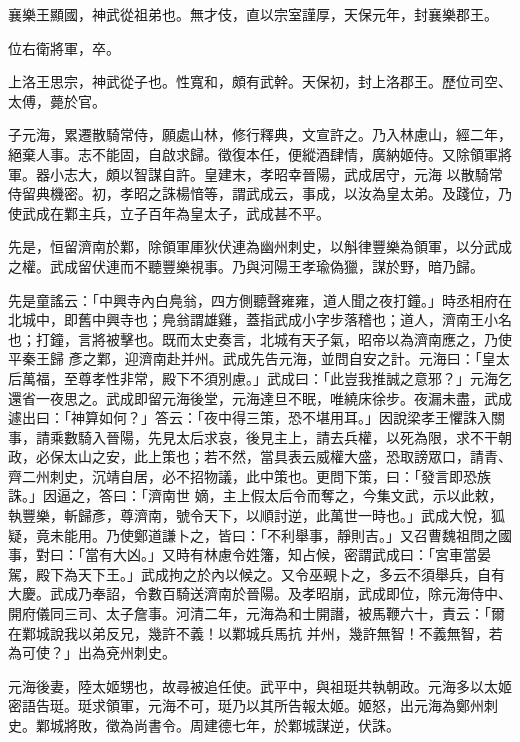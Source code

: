 \begin{pinyinscope}
 襄樂王顯國，神武從祖弟也。無才伎，直以宗室謹厚，天保元年，封襄樂郡王。



 位右衛將軍，卒。



 上洛王思宗，神武從子也。性寬和，頗有武幹。天保初，封上洛郡王。歷位司空、太傅，薨於官。



 子元海，累遷散騎常侍，願處山林，修行釋典，文宣許之。乃入林慮山，經二年，絕棄人事。志不能固，自啟求歸。徵復本任，便縱酒肆情，廣納姬侍。又除領軍將軍。器小志大，頗以智謀自許。皇建末，孝昭幸晉陽，武成居守，元海
 以散騎常侍留典機密。初，孝昭之誅楊愔等，謂武成云，事成，以汝為皇太弟。及踐位，乃使武成在鄴主兵，立子百年為皇太子，武成甚不平。



 先是，恒留濟南於鄴，除領軍厙狄伏連為幽州刺史，以斛律豐樂為領軍，以分武成之權。武成留伏連而不聽豐樂視事。乃與河陽王孝瑜偽獵，謀於野，暗乃歸。



 先是童謠云：「中興寺內白鳧翁，四方側聽聲雍雍，道人聞之夜打鐘。」時丞相府在北城中，即舊中興寺也；鳧翁謂雄雞，蓋指武成小字步落稽也；道人，濟南王小名也；打鐘，言將被擊也。既而太史奏言，北城有天子氣，昭帝以為濟南應之，乃使平秦王歸
 彥之鄴，迎濟南赴并州。武成先告元海，並問自安之計。元海曰：「皇太后萬福，至尊孝性非常，殿下不須別慮。」武成曰：「此豈我推誠之意邪？」元海乞還省一夜思之。武成即留元海後堂，元海達旦不眠，唯繞床徐步。夜漏未盡，武成遽出曰：「神算如何？」答云：「夜中得三策，恐不堪用耳。」因說梁孝王懼誅入關事，請乘數騎入晉陽，先見太后求哀，後見主上，請去兵權，以死為限，求不干朝政，必保太山之安，此上策也；若不然，當具表云威權大盛，恐取謗眾口，請青、齊二州刺史，沉靖自居，必不招物議，此中策也。更問下策，曰：「發言即恐族誅。」因逼之，答曰：「濟南世
 嫡，主上假太后令而奪之，今集文武，示以此敕，執豐樂，斬歸彥，尊濟南，號令天下，以順討逆，此萬世一時也。」武成大悅，狐疑，竟未能用。乃使鄭道謙卜之，皆曰：「不利舉事，靜則吉。」又召曹魏祖問之國事，對曰：「當有大凶。」又時有林慮令姓籓，知占候，密謂武成曰：「宮車當晏駕，殿下為天下王。」武成拘之於內以候之。又令巫覡卜之，多云不須舉兵，自有大慶。武成乃奉詔，令數百騎送濟南於晉陽。及孝昭崩，武成即位，除元海侍中、開府儀同三司、太子詹事。河清二年，元海為和士開譖，被馬鞭六十，責云：「爾在鄴城說我以弟反兄，幾許不義！以鄴城兵馬抗
 并州，幾許無智！不義無智，若為可使？」出為兗州刺史。



 元海後妻，陸太姬甥也，故尋被追任使。武平中，與祖珽共執朝政。元海多以太姬密語告珽。珽求領軍，元海不可，珽乃以其所告報太姬。姬怒，出元海為鄭州刺史。鄴城將敗，徵為尚書令。周建德七年，於鄴城謀逆，伏誅。




\end{pinyinscope}
